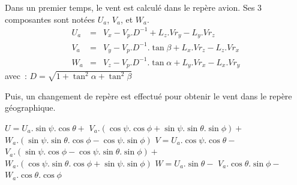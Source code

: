 Dans un premier temps, le vent est calcul\'e dans le 
rep\`ere avion. Ses 3 composantes sont not\'ees $U_a$, $V_a$,
et $W_a$. 
\begin{eqnarray*}
U_a & = & V_x - V_p.D^{-1} + L_z . Vr_y - L_y . Vr_z\\
V_a & = & V_y - V_p.D^{-1}.\tan\beta + L_x.Vr_z - L_z.Vr_x\\
W_a & = & V_z - V_p.D^{-1}.\tan\alpha + L_y . Vr_x - L_x.Vr_y
\end{eqnarray*}
avec~: $ D = \sqrt{1+\tan^2\alpha+\tan^2\beta}$

Puis, un changement de rep\`ere est effectu\'e pour obtenir le 
vent dans le rep\`ere g\'eographique.

$U = U_a.\sin\psi.\cos\theta +$
        $V_a.(\cos\psi.\cos\phi+\sin\psi.\sin\theta.\sin\phi) +$
        $W_a.(\sin\psi.\sin\theta.\cos\phi - \cos\psi.\sin\phi)$ \newline
$V = U_a.\cos\psi.\cos\theta -$
        $V_a.(\sin\psi.\cos\phi - \cos\psi.\sin\theta.\sin\phi) +$
        $W_a.(\cos\psi.\sin\theta.\cos\phi + \sin\psi.\sin\phi)$\newline
$W = U_a.\sin\theta -$ 
        $V_a.\cos\theta.\sin\phi -$
        $W_a.\cos\theta.\cos\phi$

